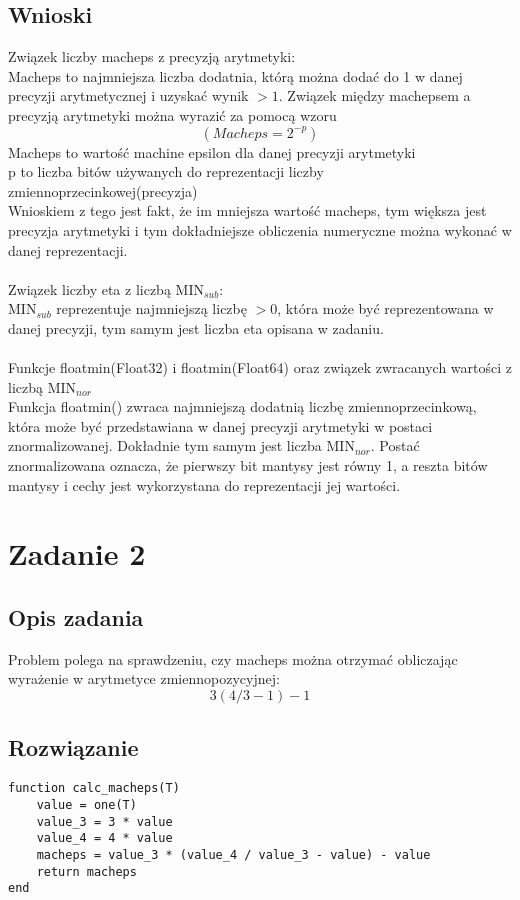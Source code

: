 \documentclass[11pt]{article}
\begin{document}
\subsection{Wnioski}
Związek liczby macheps z precyzją arytmetyki:\\
Macheps to najmniejsza liczba dodatnia, którą można dodać do 1 w danej precyzji arytmetycznej i uzyskać wynik $> 1$. Związek między machepsem a precyzją arytmetyki można wyrazić za pomocą wzoru $$(Macheps = 2^{-p})$$
Macheps to wartość machine epsilon dla danej precyzji arytmetyki\\
p to liczba bitów używanych do reprezentacji liczby zmiennoprzecinkowej(precyzja)\\
Wnioskiem z tego jest fakt, że im mniejsza wartość macheps, tym większa jest precyzja arytmetyki i tym dokładniejsze obliczenia numeryczne można wykonać w danej reprezentacji.\\ 
\\
Związek liczby eta z liczbą $\mathrm{MIN}_{sub}$: \\
$\mathrm{MIN}_{sub}$ reprezentuje najmniejszą liczbę $> 0$, która może być reprezentowana w danej precyzji, tym samym jest liczba eta opisana w zadaniu.\\
\\
Funkcje floatmin(Float32) i floatmin(Float64) oraz związek zwracanych wartości z liczbą $\mathrm{MIN}_{nor}$\\
Funkcja floatmin() zwraca najmniejszą dodatnią liczbę zmiennoprzecinkową, która może być przedstawiana w danej precyzji arytmetyki w postaci znormalizowanej. Dokładnie tym samym jest liczba $\mathrm{MIN}_{nor}$. Postać znormalizowana oznacza, że pierwszy bit mantysy jest równy 1, a reszta bitów mantysy i cechy jest wykorzystana do reprezentacji jej wartości.\\

\section{Zadanie 2}
\subsection{Opis zadania}
Problem polega na sprawdzeniu, czy macheps można otrzymać obliczając wyrażenie w arytmetyce zmiennopozycyjnej:
$$3\left(4/3-1\right)-1$$
\subsection{Rozwiązanie}
\begin{verbatim}
function calc_macheps(T)
    value = one(T)
    value_3 = 3 * value
    value_4 = 4 * value
    macheps = value_3 * (value_4 / value_3 - value) - value
    return macheps
end
\end{verbatim}
\end{document}
